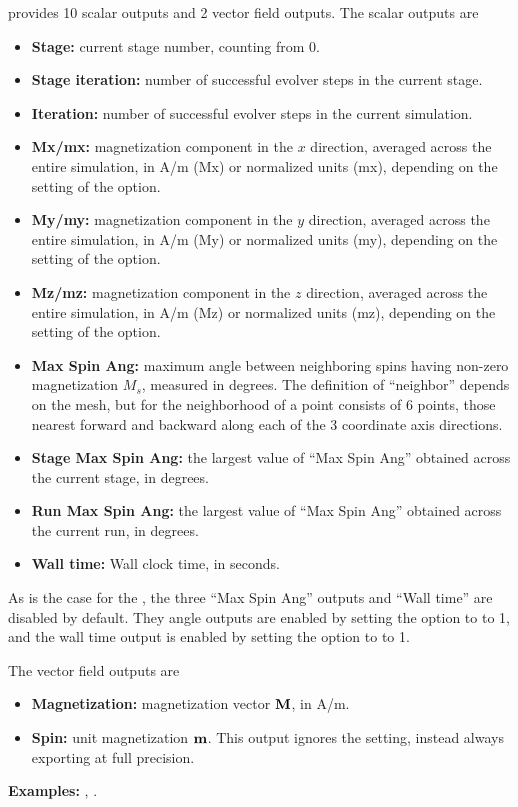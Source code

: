 \begin{description}
 provides 10 scalar outputs and 2 vector
field outputs.  The scalar outputs are
\begin{itemize}
\item \textbf{Stage:} current stage number, counting from 0.
\item \textbf{Stage iteration:} number of successful evolver steps
in the current stage.
\item \textbf{Iteration:} number of successful evolver steps in the
current simulation.
\item \textbf{Mx/mx:} magnetization component in the $x$ direction,
averaged across the entire simulation, in A/m (Mx) or normalized units
(mx), depending on the setting of the 
option.
\item \textbf{My/my:} magnetization component in the $y$ direction,
averaged across the entire simulation, in A/m (My) or normalized units
(my), depending on the setting of the 
option.
\item \textbf{Mz/mz:} magnetization component in the $z$ direction,
averaged across the entire simulation, in A/m (Mz) or normalized units
(mz), depending on the setting of the 
option.
\item \textbf{Max Spin Ang:} maximum angle between neighboring spins
having non-zero magnetization $M_s$, measured in degrees.  The definition
of ``neighbor'' depends on the mesh, but for 
the neighborhood of a point consists of 6 points, those nearest
forward and backward along each of the 3 coordinate axis directions.
\item \textbf{Stage Max Spin Ang:} the largest value of ``Max Spin
Ang'' obtained across the current stage, in degrees.
\item \textbf{Run Max Spin Ang:} the largest value of ``Max Spin
Ang'' obtained across the current run, in degrees.
\item \textbf{Wall time:} Wall clock time, in seconds.
\end{itemize}
As is the case for the , the three ``Max Spin Ang''
outputs and ``Wall time'' are disabled by default.  They angle outputs
are enabled by setting the  option to
to 1, and the wall time output is enabled by setting the
 option to to 1.

The vector field outputs are
\begin{itemize}
\item \textbf{Magnetization:} magnetization vector $\textbf{M}$, in A/m.
\item \textbf{Spin:} unit magnetization $\textbf{m}$.  This output ignores the
  setting, instead
always exporting at full precision.
\end{itemize}

\textbf{Examples:} , .

\end{description}


